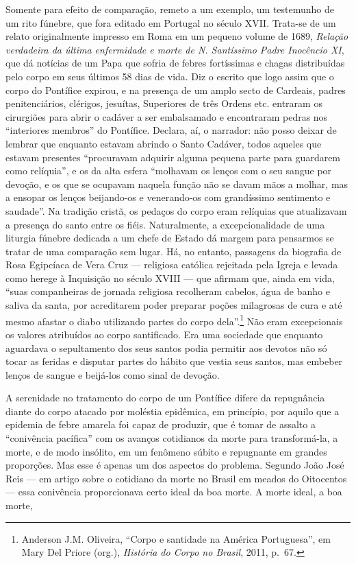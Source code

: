 Somente para efeito de comparação, remeto a um exemplo, um testemunho de
um rito fúnebre, que fora editado em Portugal no século XVII. Trata-se
de um relato originalmente impresso em Roma em um pequeno volume de
1689, \textit{Relação verdadeira da última enfermidade e morte de N.
Santíssimo Padre Inocêncio XI}, que dá notícias de um Papa que sofria de
febres fortíssimas e chagas distribuídas pelo corpo em seus últimos 58
dias de vida. Diz o escrito que logo assim que o corpo do Pontífice
expirou, e na presença de um amplo secto de Cardeais, padres
penitenciários, clérigos, jesuítas, Superiores de três Ordens etc.
entraram os cirurgiões para abrir o cadáver a ser embalsamado e
encontraram pedras nos ``interiores membros'' do Pontífice. Declara, aí,
o narrador: não posso deixar de lembrar que enquanto estavam abrindo o
Santo Cadáver, todos aqueles que estavam presentes ``procuravam adquirir
alguma pequena parte para guardarem como relíquia'', e os da alta esfera
``molhavam os lenços com o seu sangue por devoção, e os que se ocupavam
naquela função não se davam mãos a molhar, mas a ensopar os lenços
beijando-os e venerando-os com grandíssimo sentimento e saudade''. Na
tradição cristã, os pedaços do corpo eram relíquias que atualizavam a
presença do santo entre os fiéis. Naturalmente, a excepcionalidade de
uma liturgia fúnebre dedicada a um chefe de Estado dá margem para
pensarmos se tratar de uma comparação sem lugar. Há, no entanto,
passagens da biografia de Rosa Egipcíaca de Vera Cruz --- religiosa
católica rejeitada pela Igreja e levada como herege à Inquisição no
século XVIII --- que afirmam que, ainda em vida, ``suas companheiras de
jornada religiosa recolheram cabelos, água de banho e saliva da santa,
por acreditarem poder preparar poções milagrosas de cura e até mesmo
afastar o diabo utilizando partes do corpo dela''.\footnote{Anderson
  J.M. Oliveira, ``Corpo e santidade na América Portuguesa'', em Mary
  Del Priore (org.), \textit{História do Corpo no Brasil}, 2011, p.~67.}
Não eram excepcionais os valores atribuídos ao corpo santificado. Era
uma sociedade que enquanto aguardava o sepultamento dos seus santos
podia permitir aos devotos não só tocar as feridas e disputar partes do
hábito que vestia seus santos, mas embeber lenços de sangue e beijá-los
como sinal de devoção.

A serenidade no tratamento do corpo de um Pontífice difere da
repugnância diante do corpo atacado por moléstia epidêmica, em
princípio, por aquilo que a epidemia de febre amarela foi capaz de
produzir, que é tomar de assalto a ``conivência pacífica'' com os
avanços cotidianos da morte para transformá-la, a morte, e de modo
insólito, em um fenômeno súbito e repugnante em grandes proporções. Mas
esse é apenas um dos aspectos do problema. Segundo João José Reis --- em
artigo sobre o cotidiano da morte no Brasil em meados do Oitocentos ---
essa conivência proporcionava certo ideal da boa morte. A morte ideal, a
boa morte,

